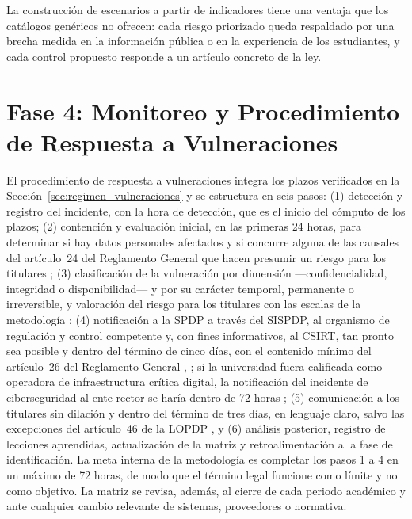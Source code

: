 La construcción de escenarios a partir de indicadores tiene una ventaja que los catálogos genéricos no ofrecen: cada riesgo priorizado queda respaldado por una brecha medida en la información pública o en la experiencia de los estudiantes, y cada control propuesto responde a un artículo concreto de la ley.

\section{Fase 4: Monitoreo y Procedimiento de Respuesta a Vulneraciones}
\label{sec:fase4_respuesta}

El procedimiento de respuesta a vulneraciones integra los plazos verificados en la Sección~\ref{sec:regimen_vulneraciones} y se estructura en seis pasos: (1) detección y registro del incidente, con la hora de detección, que es el inicio del cómputo de los plazos; (2) contención y evaluación inicial, en las primeras 24 horas, para determinar si hay datos personales afectados y si concurre alguna de las causales del artículo~24 del Reglamento General que hacen presumir un riesgo para los titulares \cite[art.~24]{rlopdp2023}; (3) clasificación de la vulneración por dimensión ---confidencialidad, integridad o disponibilidad--- y por su carácter temporal, permanente o irreversible, y valoración del riesgo para los titulares con las escalas de la metodología \cite{spdp2026vulneraciones}; (4) notificación a la SPDP a través del SISPDP, al organismo de regulación y control competente y, con fines informativos, al CSIRT, tan pronto sea posible y dentro del término de cinco días, con el contenido mínimo del artículo~26 del Reglamento General \cite[art.~43]{lopdp2021}, \cite[art.~26]{rlopdp2023}; si la universidad fuera calificada como operadora de infraestructura crítica digital, la notificación del incidente de ciberseguridad al ente rector se haría dentro de 72 horas \cite{lofc2026}; (5) comunicación a los titulares sin dilación y dentro del término de tres días, en lenguaje claro, salvo las excepciones del artículo~46 de la LOPDP \cite[art.~46]{lopdp2021}, y (6) análisis posterior, registro de lecciones aprendidas, actualización de la matriz y retroalimentación a la fase de identificación. La meta interna de la metodología es completar los pasos 1 a 4 en un máximo de 72 horas, de modo que el término legal funcione como límite y no como objetivo. La matriz se revisa, además, al cierre de cada periodo académico y ante cualquier cambio relevante de sistemas, proveedores o normativa.

